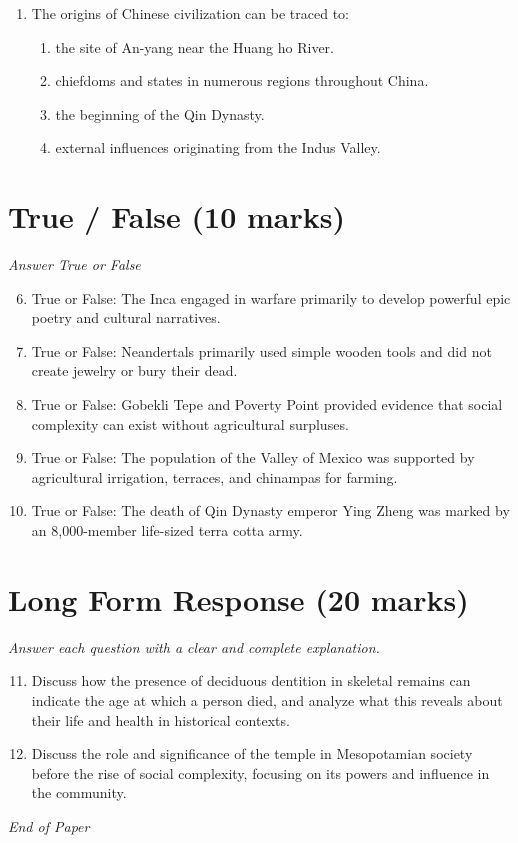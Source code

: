 \documentclass[12pt]{article}
\begin{document}
\begin{enumerate}[label=\arabic*.]
\begin{enumerate}[label=(\alph*)]
    \item catastrophism
    \item uniformitarianism
    \item unilineal evolution
\end{enumerate}
\item The origins of Chinese civilization can be traced to:
\begin{enumerate}[label=(\alph*)]
    \item the site of An-yang near the Huang ho River.
    \item chiefdoms and states in numerous regions throughout China.
    \item the beginning of the Qin Dynasty.
    \item external influences originating from the Indus Valley.
\end{enumerate}
\end{enumerate}

\section*{True / False (10 marks)}
\textit{Answer True or False}
\begin{enumerate}[label=\arabic*.]
\setcounter{enumi}{5}
\item True or False: The Inca engaged in warfare primarily to develop powerful epic poetry and cultural narratives.
\item True or False: Neandertals primarily used simple wooden tools and did not create jewelry or bury their dead.
\item True or False: Gobekli Tepe and Poverty Point provided evidence that social complexity can exist without agricultural surpluses.
\item True or False: The population of the Valley of Mexico was supported by agricultural irrigation, terraces, and chinampas for farming.
\item True or False: The death of Qin Dynasty emperor Ying Zheng was marked by an 8,000-member life-sized terra cotta army.
\end{enumerate}

\section*{Long Form Response (20 marks)}
\textit{Answer each question with a clear and complete explanation.}
\begin{enumerate}[label=\arabic*.]
\setcounter{enumi}{10}
\item Discuss how the presence of deciduous dentition in skeletal remains can indicate the age at which a person died, and analyze what this reveals about their life and health in historical contexts.
\item Discuss the role and significance of the temple in Mesopotamian society before the rise of social complexity, focusing on its powers and influence in the community.
\end{enumerate}

\vfill
\noindent\textit{End of Paper}
\end{document}
